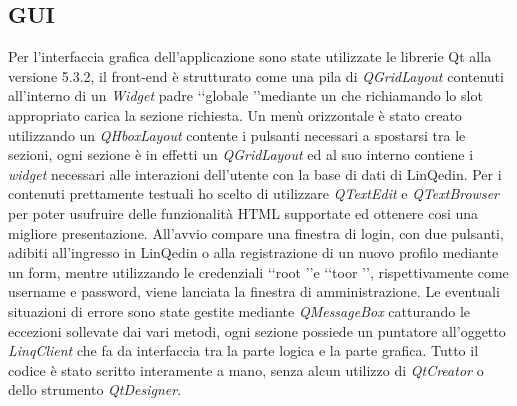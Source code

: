 \subsection*{GUI}
Per l'interfaccia grafica dell'applicazione sono state utilizzate le librerie Qt alla versione 5.3.2, il front-end è strutturato come una pila
di \textit{QGridLayout} contenuti all'interno di un \textit{Widget} padre \lq\lq globale \rq\rq mediante un  che richiamando lo
slot appropriato carica la sezione richiesta.
Un menù orizzontale è stato creato utilizzando un \textit{QHboxLayout} contente i pulsanti necessari a spostarsi tra le sezioni, ogni sezione
è in effetti un \textit{QGridLayout} ed al suo interno contiene i \textit{widget} necessari alle interazioni dell'utente con la base di dati di
LinQedin. Per i contenuti prettamente testuali ho scelto di utilizzare \textit{QTextEdit} e \textit{QTextBrowser} per poter usufruire delle funzionalità
HTML supportate ed ottenere cosi una migliore presentazione.
All'avvio compare una finestra di login, con due pulsanti, adibiti all'ingresso in LinQedin o alla registrazione di un nuovo profilo mediante un form,
mentre utilizzando le credenziali \lq\lq root \rq\rq e \lq\lq toor \rq\rq, rispettivamente come username e password, viene lanciata la finestra di amministrazione.
Le eventuali situazioni di errore sono state gestite mediante \textit{QMessageBox} catturando le eccezioni sollevate dai vari metodi, ogni sezione possiede un
puntatore all'oggetto \textit{LinqClient} che fa da interfaccia tra la parte logica e la parte grafica.
Tutto il codice è stato scritto interamente a mano, senza alcun utilizzo di \textit{QtCreator} o dello strumento \textit{QtDesigner}.
